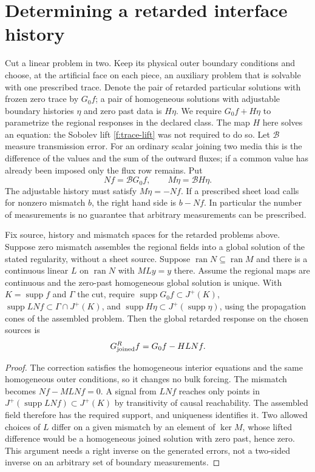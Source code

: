 \section{Determining a retarded interface history}\label{f:interface-history}

Cut a linear problem in two. Keep its physical outer boundary conditions and choose, at the artificial face on each piece, an auxiliary problem that is solvable with one prescribed trace. Denote the pair of retarded particular solutions with frozen zero trace by $G_0f$; a pair of homogeneous solutions with adjustable boundary histories $\eta$ and zero past data is $H\eta$. We require $G_0f+H\eta$ to parametrize the regional responses in the declared class. The map $H$ here solves an equation: the Sobolev lift \eqref{f:trace-lift} was not required to do so. Let $\mathcal B$ measure transmission error. For an ordinary scalar joining two media this is the difference of the values and the sum of the outward fluxes; if a common value has already been imposed only the flux row remains. Put
\[
 Nf=\mathcal BG_0f,\qquad M\eta=\mathcal B H\eta .
\]
The adjustable history must satisfy $M\eta=-Nf$. If a prescribed sheet load calls for nonzero mismatch $b$, the right hand side is $b-Nf$. In particular the number of measurements is no guarantee that arbitrary measurements can be prescribed.

\begin{proposition}\label{f:causal-sewing}
Fix source, history and mismatch spaces for the retarded problems above. Suppose zero mismatch assembles the regional fields into a global solution of the stated regularity, without a sheet source. Suppose $\operatorname{ran}N\subseteq\operatorname{ran}M$ and there is a continuous linear $L$ on $\operatorname{ran}N$ with $MLy=y$ there. Assume the regional maps are continuous and the zero-past homogeneous global solution is unique. With $K=\operatorname{supp}f$ and $\Gamma$ the cut, require $\operatorname{supp}G_0 f\subset J^+(K)$, $\operatorname{supp}LNf\subset\Gamma\cap J^+(K)$, and $\operatorname{supp}H\eta\subset J^+(\operatorname{supp}\eta)$, using the propagation cones of the assembled problem. Then the global retarded response on the chosen sources is
\begin{equation}
 G^R_{\rm joined} f=G_0f-HLNf .\label{f:sewn-inverse}
\end{equation}
\end{proposition}
\begin{proof}
The correction satisfies the homogeneous interior equations and the same homogeneous outer conditions, so it changes no bulk forcing. The mismatch becomes $Nf-MLNf=0$. A signal from $LNf$ reaches only points in $J^+(\operatorname{supp}LNf)\subset J^+(K)$ by transitivity of causal reachability. The assembled field therefore has the required support, and uniqueness identifies it. Two allowed choices of $L$ differ on a given mismatch by an element of $\ker M$, whose lifted difference would be a homogeneous joined solution with zero past, hence zero. This argument needs a right inverse on the generated errors, not a two-sided inverse on an arbitrary set of boundary measurements.
\end{proof}

